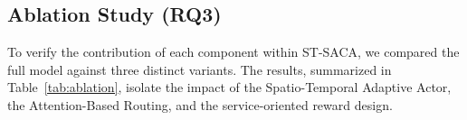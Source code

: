 \documentclass[lettersize,journal]{IEEEtran}
\begin{document}

\begin{table}[htbp]
\caption{\textcolor{blue}{Reward Comparison under Different Uncertainty}}
\label{tab:uncertainty_full}
\begin{center}
\color{blue}
\end{center}
\end{table}

\subsection{Ablation Study (RQ3)}

To verify the contribution of each component within ST-SACA, we compared the full model against three distinct variants. The results, summarized in Table~\ref{tab:ablation}, isolate the impact of the Spatio-Temporal Adaptive Actor, the Attention-Based Routing, and the service-oriented reward design.
\end{document}
